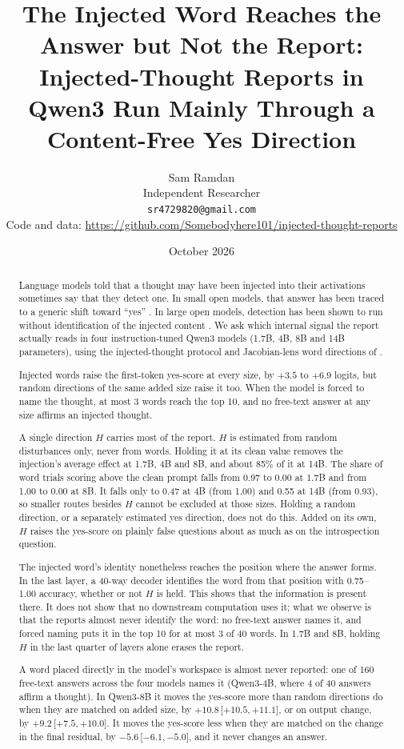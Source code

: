 \documentclass[11pt]{article}
\title{The Injected Word Reaches the Answer but Not the Report:\\ Injected-Thought Reports in Qwen3 Run Mainly Through a Content-Free Yes Direction}
\author{
  Sam Ramdan\\
  Independent Researcher\\
  \texttt{sr4729820@gmail.com}\\[4pt]
  {\small Code and data: \url{https://github.com/Somebodyhere101/injected-thought-reports}}
}
\date{October 2026}
\newcommand{\ci}[3]{\ensuremath{#1}\,[\ensuremath{#2},\allowbreak\,\ensuremath{#3}]}
\newcommand{\ys}{yes-score}
\begin{document}
\maketitle

\begin{abstract}
Language models told that a thought may have been injected into their activations sometimes say that they detect one. In small open models, that answer has been traced to a generic shift toward ``yes'' \citep{godet2025confusion,hahami2026disturbance}. In large open models, detection has been shown to run without identification of the injected content \citep{lederman2026content}. We ask which internal signal the report actually reads in four instruction-tuned Qwen3 models (1.7B, 4B, 8B and 14B parameters), using the injected-thought protocol and Jacobian-lens word directions of \citet{gurnee2026workspace}.

Injected words raise the first-token \ys{} at every size, by $+3.5$ to $+6.9$ logits, but random directions of the same added size raise it too. When the model is forced to name the thought, at most 3 words reach the top 10, and no free-text answer at any size affirms an injected thought.

A single direction $H$ carries most of the report. $H$ is estimated from random disturbances only, never from words. Holding it at its clean value removes the injection's average effect at 1.7B, 4B and 8B, and about 85\% of it at 14B. The share of word trials scoring above the clean prompt falls from 0.97 to 0.00 at 1.7B and from 1.00 to 0.00 at 8B. It falls only to 0.47 at 4B (from 1.00) and 0.55 at 14B (from 0.93), so smaller routes besides $H$ cannot be excluded at those sizes. Holding a random direction, or a separately estimated yes direction, does not do this. Added on its own, $H$ raises the \ys{} on plainly false questions about as much as on the introspection question.

The injected word's identity nonetheless reaches the position where the answer forms. In the last layer, a 40-way decoder identifies the word from that position with 0.75--1.00 accuracy, whether or not $H$ is held. This shows that the information is present there. It does not show that no downstream computation uses it; what we observe is that the reports almost never identify the word: no free-text answer names it, and forced naming puts it in the top 10 for at most 3 of 40 words. In 1.7B and 8B, holding $H$ in the last quarter of layers alone erases the report.

A word placed directly in the model's workspace is almost never reported: one of 160 free-text answers across the four models names it (Qwen3-4B, where 4 of 40 answers affirm a thought). In Qwen3-8B it moves the \ys{} more than random directions do when they are matched on added size, by \ci{+10.8}{+10.5}{+11.1}, or on output change, by \ci{+9.2}{+7.5}{+10.0}. It moves the \ys{} less when they are matched on the change in the final residual, by \ci{-5.6}{-6.1}{-5.0}, and it never changes an answer.


\end{abstract}
\end{document}
